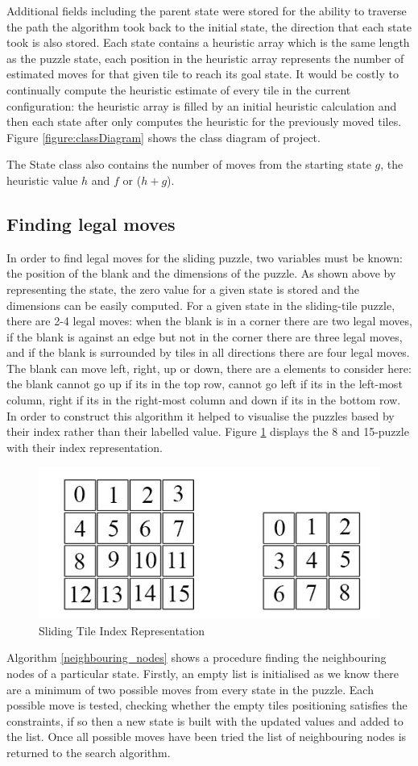 \documentclass[final]{cmpreport}
\begin{document}
Additional fields including the parent state were stored for the ability to traverse the path the algorithm took back to the initial state, the direction that each state took is also stored. Each state contains a heuristic array which is the same length as the puzzle state, each position in the heuristic array represents the number of estimated moves for that given tile to reach its goal state. It would be costly to continually compute the heuristic estimate of every tile in the current configuration: the heuristic array is filled by an initial heuristic calculation and then each state after only computes the heuristic for the previously moved tiles. Figure \ref{figure:classDiagram} shows the class diagram of project.

The State class also contains the number of moves from the starting state $g$, the heuristic value $h$ and $f$ or ($h+g$).

\subsection{Finding legal moves}
In order to find legal moves for the sliding puzzle, two variables must be known: the position of the blank and the dimensions of the puzzle. As shown above by representing the state, the zero value for a given state is stored and the dimensions can be easily computed. For a given state in the sliding-tile puzzle, there are 2-4 legal moves: when the blank is in a corner there are two legal moves, if the blank is against an edge but not in the corner there are three legal moves, and if the blank is surrounded by tiles in all directions there are four legal moves. The blank can move left, right, up or down, there are a elements to consider here: the blank cannot go up if its in the top row, cannot go left if its in the left-most column, right if its in the right-most column and down if its in the bottom row. In order to construct this algorithm it helped to visualise the puzzles based by their index rather than their labelled value. Figure \ref{figure:index} displays the 8 and 15-puzzle with their index representation. 
\begin{figure}[h!]
	\centering
	\includegraphics[width=.5\textwidth]{tile_indexes}
	\captionsetup{justification=centering}
	\caption{Sliding Tile Index Representation}
	\label{figure:index}
\end{figure}
Algorithm \ref{neighbouring_nodes} shows a procedure finding the neighbouring nodes of a particular state. Firstly, an empty list is initialised as we know there are a minimum of two possible moves from every state in the puzzle. Each possible move is tested, checking whether the empty tiles positioning satisfies the constraints, if so then a new state is built with the updated values and added to the list. Once all possible moves have been tried the list of neighbouring nodes is returned to the search algorithm.
\end{document}
